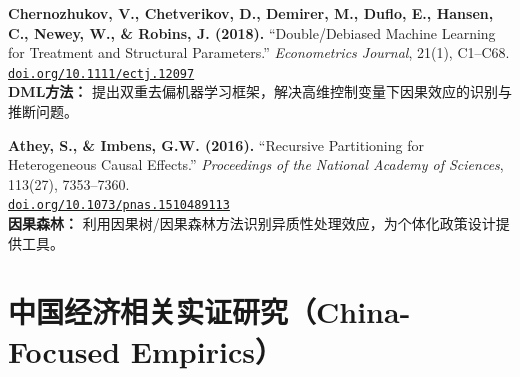 \documentclass[12pt, a4paper]{article}
\begin{document}
\begin{enumerate}[label=\textbf{[\arabic*]}, leftmargin=*, itemsep=1em, start=16]

\item \textbf{Chernozhukov, V., Chetverikov, D., Demirer, M., Duflo, E., Hansen, C., Newey, W., \& Robins, J. (2018).}
  ``Double/Debiased Machine Learning for Treatment and Structural Parameters.''
  \emph{Econometrics Journal}, 21(1), C1--C68.\\
  \href{https://doi.org/10.1111/ectj.12097}{\texttt{doi.org/10.1111/ectj.12097}}\\
  {\small \textcolor{asher}{\textbf{DML方法：} 提出双重去偏机器学习框架，解决高维控制变量下因果效应的识别与推断问题。}}

\item \textbf{Athey, S., \& Imbens, G.W. (2016).}
  ``Recursive Partitioning for Heterogeneous Causal Effects.''
  \emph{Proceedings of the National Academy of Sciences}, 113(27), 7353--7360.\\
  \href{https://doi.org/10.1073/pnas.1510489113}{\texttt{doi.org/10.1073/pnas.1510489113}}\\
  {\small \textcolor{asher}{\textbf{因果森林：} 利用因果树/因果森林方法识别异质性处理效应，为个体化政策设计提供工具。}}

\end{enumerate}

\section*{中国经济相关实证研究（China-Focused Empirics）}
\end{document}
